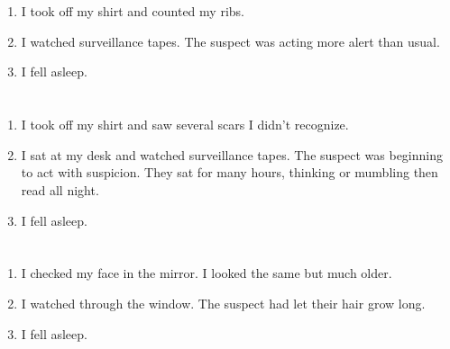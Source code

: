 \documentclass{article}
\begin{document}
    \newpage
    
    \section{}
    
    \begin{enumerate}
    
    \item I took off my shirt and counted my ribs.\\
    
    \item I watched surveillance tapes. The suspect was acting more alert than usual.\\
    
    \item I fell asleep.\\
    
    \end{enumerate}
     
    \newpage
    
    \section{}
    
    \begin{enumerate}
    
    \item I took off my shirt and saw several scars I didn't recognize.\\
    
    \item I sat at my desk and watched surveillance tapes. The suspect was beginning to act with suspicion. They sat for many hours, thinking or mumbling then read all night.\\
    
    \item I fell asleep.\\
    
    \end{enumerate}
     
    \newpage
    
    \section{}
    
    \begin{enumerate}
    
    \item I checked my face in the mirror. I looked the same but much older.\\
    
    \item I watched through the window. The suspect had let their hair grow long.\\
    
    \item I fell asleep.\\
    
    \end{enumerate}
     
\end{document}
